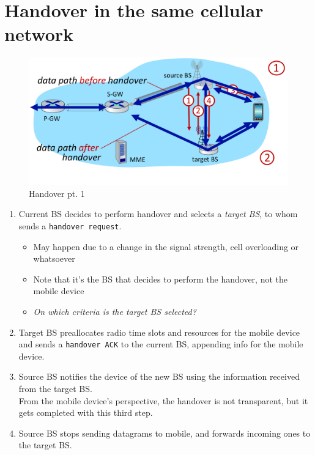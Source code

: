 \section{Handover in the same cellular network}
\begin{paracol}{2}
   \begin{figure}[htbp]
      \centering
      \includegraphics{images/4g_BSHO1.png}
      \caption{Handover pt. 1}
      \label{fig:4g_BSHO1}
   \end{figure}
   \switchcolumn
   \begin{enumerate}
      \item Current BS decides to perform handover and selects a \textit{target BS}, to whom sends a \texttt{handover request}.
      \begin{itemize}
         \item May happen due to a change in the signal strength, cell overloading or whatsoever
         \item Note that it's the BS that decides to perform the handover, not the mobile device
         \item \textit{On which criteria is the target BS selected?}
      \end{itemize}
      \item Target BS preallocates radio time slots and resources for the mobile device and sends a \texttt{handover ACK} to the current BS, appending info for the mobile device.
      \item Source BS notifies the device of the new BS using the information received from the target BS.\\
      From the mobile device's perspective, the handover is not transparent, but it gets completed with this third step.
      \item Source BS stops sending datagrams to mobile, and forwards incoming ones to the target BS.
   \end{enumerate}
\end{paracol}

